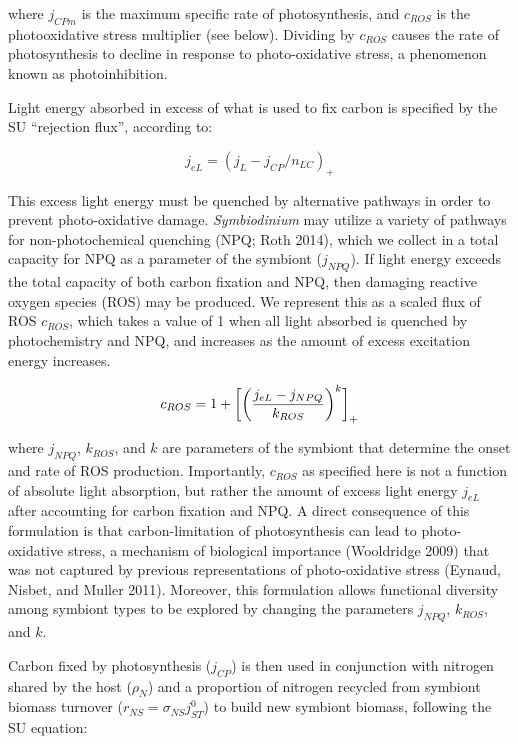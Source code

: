\documentclass[]{elsarticle} %
\begin{document}
where \(j_{CPm}\) is the maximum specific rate of photosynthesis, and
\(c_{ROS}\) is the photooxidative stress multiplier (see below).
Dividing by \(c_{ROS}\) causes the rate of photosynthesis to decline in
response to photo-oxidative stress, a phenomenon known as
photoinhibition.

Light energy absorbed in excess of what is used to fix carbon is
specified by the SU ``rejection flux'', according to:

\begin{equation} j_{eL} = (j_L - j_{CP} / n_{LC})_+ \end{equation}

This excess light energy must be quenched by alternative pathways in
order to prevent photo-oxidative damage. \emph{Symbiodinium} may utilize
a variety of pathways for non-photochemical quenching (NPQ; Roth 2014),
which we collect in a total capacity for NPQ as a parameter of the
symbiont (\(j_{NPQ}\)). If light energy exceeds the total capacity of
both carbon fixation and NPQ, then damaging reactive oxygen species
(ROS) may be produced. We represent this as a scaled flux of ROS
\(c_{ROS}\), which takes a value of 1 when all light absorbed is
quenched by photochemistry and NPQ, and increases as the amount of
excess excitation energy increases.

\begin{equation} c_{ROS} = 1 + \bigg[\bigg({{j_{eL} - j_{NPQ}} \over k_{ROS}}\bigg)^k\bigg]_+ \end{equation}

where \(j_{NPQ}\), \(k_{ROS}\), and \(k\) are parameters of the symbiont
that determine the onset and rate of ROS production. Importantly,
\(c_{ROS}\) as specified here is not a function of absolute light
absorption, but rather the amount of excess light energy \(j_{eL}\)
after accounting for carbon fixation and NPQ. A direct consequence of
this formulation is that carbon-limitation of photosynthesis can lead to
photo-oxidative stress, a mechanism of biological importance (Wooldridge
2009) that was not captured by previous representations of
photo-oxidative stress (Eynaud, Nisbet, and Muller 2011). Moreover, this
formulation allows functional diversity among symbiont types to be
explored by changing the parameters \(j_{NPQ}\), \(k_{ROS}\), and \(k\).

Carbon fixed by photosynthesis (\(j_{CP}\)) is then used in conjunction
with nitrogen shared by the host (\(\rho_N\)) and a proportion of
nitrogen recycled from symbiont biomass turnover
(\(r_{NS}=\sigma_{NS}j_{ST}^0\)) to build new symbiont biomass,
following the SU equation:
\end{document}
